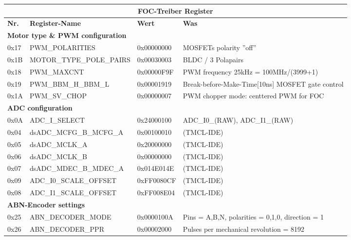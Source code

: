 \begin{table}[H]
\begin{tabularx}{\linewidth}{|l|l|l|X|}
\hline
\multicolumn{4}{|c|}{\textbf{FOC-Treiber Register}}               \\ \hline
\textbf{Nr. }& \textbf{Register-Name   }   & \textbf{Wert }      & \textbf{Was} \\ \hline
\multicolumn{4}{|l|}{\textbf{Motor type \&  PWM configuration}}        \\ \hline
0x17         & PWM\_POLARITIES             & 0x00000000 & MOSFETs polarity ''off''    \\ \hline
0x1B         & MOTOR\_TYPE\_POLE\_PAIRS & 0x00030003 & BLDC / 3 Polapairs    \\ \hline
0x18         & PWM\_MAXCNT                 & 0x00000F9F & PWM frequency 25kHz = 100MHz/(3999+1)   \\ \hline
0x19         & PWM\_BBM\_H\_BBM\_L         & 0x00001919 & Break-before-Make-Time[10ns] MOSFET gate control \\ \hline
0x1A         & PWM\_SV\_CHOP               & 0x00000007 & PWM chopper mode: centtered PWM for FOC \\ \hline
\multicolumn{4}{|l|}{\textbf{ADC configuration}}                       \\ \hline
0x0A         & ADC\_I\_SELECT              & 0x24000100 & ADC\_I0\_(RAW), ADC\_I1\_(RAW)    \\ \hline
0x04         & dsADC\_MCFG\_B\_MCFG\_A     & 0x00100010 & (TMCL-IDE)    \\ \hline
0x05         & dsADC\_MCLK\_A              & 0x20000000 & (TMCL-IDE)    \\ \hline
0x06         & dsADC\_MCLK\_B              & 0x00000000 & (TMCL-IDE)    \\ \hline
0x07         & dsADC\_MDEC\_B\_MDEC\_A     & 0x014E014E & (TMCL-IDE)    \\ \hline
0x09         & ADC\_I0\_SCALE\_OFFSET      & 0xFF0080CF & (TMCL-IDE)    \\ \hline
0x08         & ADC\_I1\_SCALE\_OFFSET      & 0xFF008E04 & (TMCL-IDE)    \\ \hline
\multicolumn{4}{|l|}{\textbf{ABN-Encoder settings}}           \\ \hline
0x25         & ABN\_DECODER\_MODE            & 0x0000100A & Pins = A,B,N, polarities = 0,1,0, direction = 1    \\ \hline
0x26         & ABN\_DECODER\_PPR             & 0x00002000 & Pulses per mechanical revolution = 8192 \\ \hline

\end{tabularx}
\end{table}
